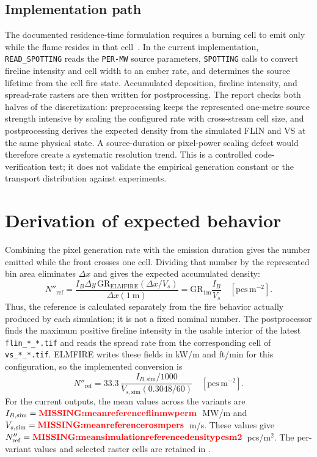 \subsection{Implementation path}

The documented residence-time formulation requires a burning cell to emit only
while the flame resides in that cell~\cite{Qin2025}. In the current implementation,
\texttt{READ\_SPOTTING} reads the \texttt{PER-MW} source parameters,
\texttt{SPOTTING} calls  to convert
fireline intensity and cell width to an ember rate, and
 determines the source lifetime from the
cell fire state. Accumulated deposition, fireline intensity, and spread-rate
rasters are then written for postprocessing. The report checks both halves of
the discretization: preprocessing keeps the represented one-metre source
strength intensive by scaling the configured rate with cross-stream cell size,
and postprocessing derives the expected density from the simulated FLIN and VS
at the same physical state. A source-duration or pixel-power scaling defect
would therefore create a systematic resolution trend. This is a controlled
code-verification test; it does not validate the empirical generation constant
or the transport distribution against experiments.

\section{Derivation of expected behavior}
Combining the pixel generation rate with the emission duration gives the
number emitted while the front crosses one cell. Dividing that number by the
represented bin area eliminates $\Delta x$ and gives the expected accumulated
density:
\[
  N''_{\mathrm{ref}}
  =\frac{I_B\Delta y\,\mathrm{GR}_{\mathrm{ELMFIRE}}
          (\Delta x/V_s)}{\Delta x(1~\mathrm{m})}
  =\mathrm{GR}_{1\mathrm{m}}\frac{I_B}{V_s}
  \quad [\mathrm{pcs\,m^{-2}}].
\]
Thus, the reference is calculated separately from the fire behavior actually
produced by each simulation; it is not a fixed nominal number. The
postprocessor finds the maximum positive fireline intensity in the usable
interior of the latest \texttt{flin\_*\_*.tif} and reads the spread rate from
the corresponding cell of \texttt{vs\_*\_*.tif}. ELMFIRE writes these fields
in kW/m and ft/min for this configuration, so the implemented conversion is
\[
  N''_{\mathrm{ref}}
  =33.3\,\frac{I_{B,\mathrm{sim}}/1000}
                    {V_{s,\mathrm{sim}}(0.3048/60)}
  \quad [\mathrm{pcs\,m^{-2}}].
\]
For the current outputs, the mean values across the variants are
$I_{B,\mathrm{sim}}=\Metric{meanreferenceflinmwperm}$~MW/m and
$V_{s,\mathrm{sim}}=\Metric{meanreferencerosmpers}$~m/s. These values give
$N''_{\mathrm{ref}}=\Metric{meansimulationreferencedensitypcsm2}$~pcs/m$^2$.
The per-variant values and selected raster cells are retained in
.


